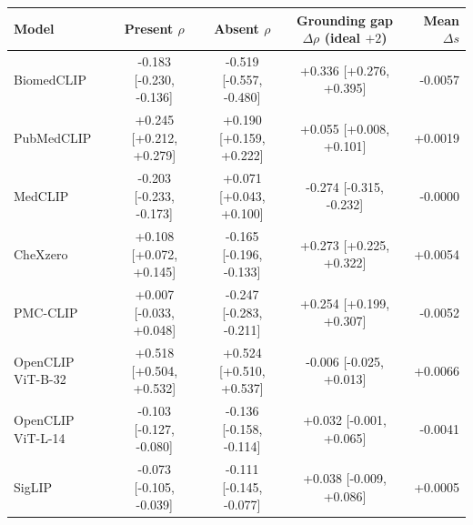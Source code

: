 \begin{tabular}{lcccr}
\toprule
Model & Present $\rho$ & Absent $\rho$ & Grounding gap $\Delta\rho$ (ideal $+2$) & Mean $\Delta s$ \\
\midrule
BiomedCLIP & -0.183 [-0.230, -0.136] & -0.519 [-0.557, -0.480] & +0.336 [+0.276, +0.395] & -0.0057 \\
PubMedCLIP & +0.245 [+0.212, +0.279] & +0.190 [+0.159, +0.222] & +0.055 [+0.008, +0.101] & +0.0019 \\
MedCLIP & -0.203 [-0.233, -0.173] & +0.071 [+0.043, +0.100] & -0.274 [-0.315, -0.232] & -0.0000 \\
CheXzero & +0.108 [+0.072, +0.145] & -0.165 [-0.196, -0.133] & +0.273 [+0.225, +0.322] & +0.0054 \\
PMC-CLIP & +0.007 [-0.033, +0.048] & -0.247 [-0.283, -0.211] & +0.254 [+0.199, +0.307] & -0.0052 \\
OpenCLIP ViT-B-32 & +0.518 [+0.504, +0.532] & +0.524 [+0.510, +0.537] & -0.006 [-0.025, +0.013] & +0.0066 \\
OpenCLIP ViT-L-14 & -0.103 [-0.127, -0.080] & -0.136 [-0.158, -0.114] & +0.032 [-0.001, +0.065] & -0.0041 \\
SigLIP & -0.073 [-0.105, -0.039] & -0.111 [-0.145, -0.077] & +0.038 [-0.009, +0.086] & +0.0005 \\
\bottomrule
\end{tabular}
